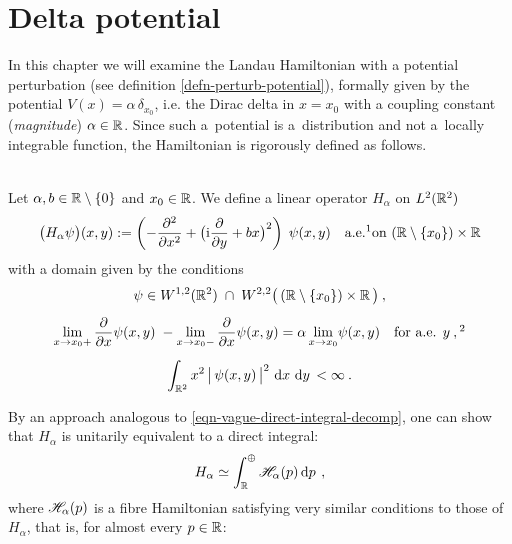 \chapter{Delta potential} \label{chapter-dirac}
In this chapter we will examine the Landau Hamiltonian with a potential perturbation (see definition \ref{defn-perturb-potential}), formally given by the potential $V(x) = \alpha\,\delta_{x_0}$, i.e. the Dirac delta in $x=x_0$ with a coupling constant (\textit{magnitude}) $\alpha \in \mathbb{R}$. Since such a~potential is a~distribution and not a~locally integrable function, the Hamiltonian is rigorously defined as follows.
\begin{defn}
    \label{defn-hamiltonian-dirac}
    \\
    Let $\alpha, b \in \mathbb{R} \setminus \{ 0 \}$ and $x_0 \in \mathbb{R}$. We define a linear operator $H_\alpha$ on $L^2(\mathbb{R}^2)$
    \begin{equation*}
        \big( H_\alpha \psi \big)(x, y) := \left( -\pd{^2}{x^2} + \big( \i\pd{}{y} + bx \big)^2 \right) \; \psi(x,y)
        \quad \text{a.e.\footnotemark on } (\R \setminus \{ x_0 \}) \times \R
    \end{equation*}
    with a domain given by the conditions
    \begin{gather*}
        \psi \in W^{1,2}(\R^2) \; \cap \; W^{2,2}\big( \,(\R \setminus \{ x_0 \}) \times \R \, \big) \: ,
        \\[5pt]
        \lim_{x \to x_0 +} \pd{}{x}\psi(x,y)\; - \lim_{x \to x_0 -} \pd{}{x}\psi(x,y) = \alpha \lim_{x \to x_0} \!\psi(x, y)
        \quad \text{for a.e. } y \: ,\footnotemark
        \\[5pt]
        \int_{\R^2} x^2 \, \big|\, \psi(x,y) \,\big|^2 \, \d{x}\d{y} < \infty \: .
    \end{gather*}
\end{defn}
By an approach analogous to \eqref{eqn-vague-direct-integral-decomp}, one can show that $H_\alpha$ is unitarily equivalent to a direct integral:
\begin{equation*}
    H_\alpha \simeq \int^\oplus_{\mathbb{R}} \mathscr{H}_\alpha(p) \, \mathrm{d}p \, \: ,
\end{equation*}
where $\mathscr{H}_\alpha(p)$ is a fibre Hamiltonian satisfying very similar conditions to those of~$H_\alpha$, that is, for almost every $p \in \mathbb{R}$:
